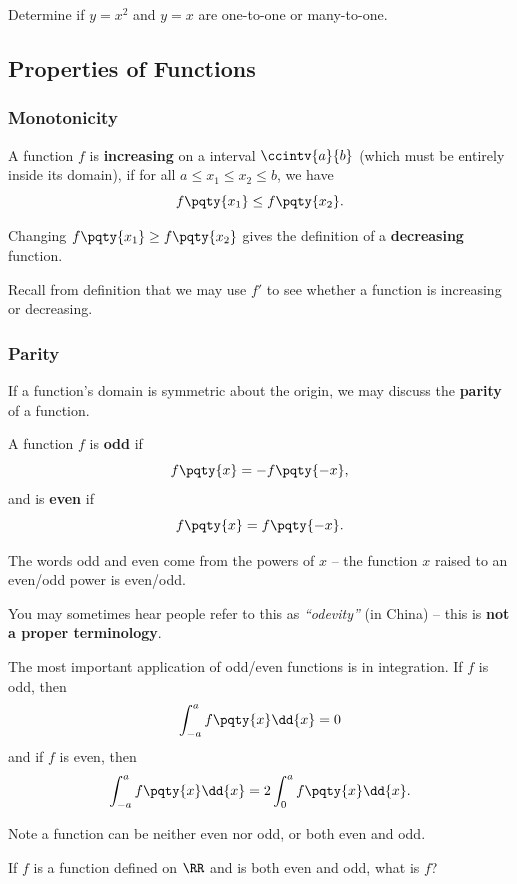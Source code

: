 \documentclass{article}
\begin{document}
\begin{example}
    Determine if \(y = x^2\) and \(y = x\) are one-to-one or many-to-one.
\end{example}

\subsection{Properties of Functions}
\subsubsection{Monotonicity}

A function \(f\) is \textbf{increasing} on a interval \(\ccintv{a}{b}\) (which must be entirely inside its domain), if for all \(a \leq x_1 \leq x_2 \leq b\), we have
\[
    f\pqty{x_1} \leq f\pqty{x_2}.
\]

Changing \(f\pqty{x_1} \geq f\pqty{x_2}\) gives the definition of a \textbf{decreasing} function.

Recall from definition that we may use \(f'\) to see whether a function is increasing or decreasing.

\subsubsection{Parity}

If a function's domain is symmetric about the origin, we may discuss the \textbf{parity} of a function.

A function \(f\) is \textbf{odd} if
\[
    f\pqty{x} = - f\pqty{-x},
\]
and is \textbf{even} if
\[
    f\pqty{x} = f\pqty{-x}.
\]

The words odd and even come from the powers of \(x\) -- the function \(x\) raised to an even/odd power is even/odd.

\begin{remark}
    You may sometimes hear people refer to this as \textit{``odevity''} (in China) -- this is \textbf{not a proper terminology}.
\end{remark}

The most important application of odd/even functions is in integration. If \(f\) is odd, then
\[
    \int_{-a}^{a} f\pqty{x} \dd{x} = 0
\]
and if \(f\) is even, then
\[
    \int_{-a}^{a} f\pqty{x} \dd{x} = 2 \int_{0}^{a} f\pqty{x} \dd{x}.
\]

Note a function can be neither even nor odd, or both even and odd.

\begin{example}
    If \(f\) is a function defined on \(\RR\) and is both even and odd, what is \(f\)?
\end{example}
\end{document}

